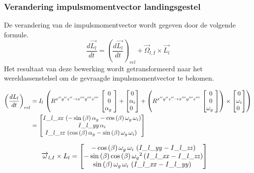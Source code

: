 \subsubsection{Verandering impulsmomentvector landingsgestel}
De verandering van de impulsmomentvector wordt gegeven door de volgende formule. 
\begin{equation*}
\frac{d\overrightarrow{L_{l}}}{dt}=\left(\frac{d\overrightarrow{L_{l}}}{dt}\right)_{rel}+\overrightarrow{\Omega}_{l,I}\times \overrightarrow{L_{l}}
\end{equation*}
Het resultaat van deze bewerking wordt getransformeerd naar het wereldassenstelsel om de gevraagde impulsmomentvector te bekomen.

\begin{align*}
\left(\frac{dL_{l}}{dt}\right)_{rel}&=I_{l}\,\left(R^{x''y''z'' \rightarrow x'''y'''z'''}\,\begin{bmatrix}
0\\
0\\
\alpha_{g}\
\end{bmatrix}
+\begin{bmatrix}
0\\
\alpha_{i}\\
0\
\end{bmatrix}
+\left(R^{x''y''z'' \rightarrow x'''y'''z'''}\,\begin{bmatrix}
0\\
0\\
\omega_{g}\
\end{bmatrix}
\right)\times\begin{bmatrix}
0\\
\omega_{i}\\
0\
\end{bmatrix}
\right)\\
&=\begin{bmatrix}
{\it I\_l\_xx}\, \left( -\sin \left( \beta
 \right) \alpha_{g}-\cos \left( \beta \right) \omega_{g}\,\omega_{i}
 \right) \\ 
 {\it I\_l\_yy}\,\alpha_{i}
\\ 
%
{\it I\_l\_zz}\, \left( \cos \left( \beta
 \right) \alpha_{g}-\sin \left( \beta \right) \omega_{g}\,\omega_{i}
 \right) \
\end{bmatrix}
\end{align*}

\begin{equation*}
\begin{split}
\overrightarrow{\omega}_{l,I}\times L_{l}&=\begin{bmatrix}
-\cos \left( \beta \right) \omega_{g}\,
\omega_{i}\, \left( {\it I\_l\_yy}-{\it I\_l\_zz} \right) 
\\ 
-\sin \left( \beta \right) \cos \left( \beta
 \right) {\omega_{g}}^{2} \left( {\it I\_l\_xx}-{\it I\_l\_zz}
 \right) \\ 
 \sin \left( \beta \right) \omega_{g}\,
\omega_{i}\, \left( {\it I\_l\_xx}-{\it I\_l\_yy} \right) \
\end{bmatrix}
\end{split}
\end{equation*}

